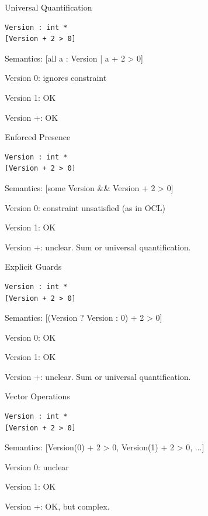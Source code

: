 \documentclass[table,15pt,t]{beamer}
\begin{document}
\begin{frame}[fragile,c]{Universal Quantification}
\begin{lstlisting}
Version : int *
[Version + 2 > 0]
\end{lstlisting}
\begin{list}{}{}
    \item Semantics: [all a : Version | a + 2 > 0]\pause
    \item Version 0: ignores constraint
    \item Version 1: OK
    \item Version +: OK
\end{list}
\end{frame}

\begin{frame}[fragile,c]{Enforced Presence}
\begin{lstlisting}
Version : int *
[Version + 2 > 0]
\end{lstlisting}
\begin{list}{}{}
    \item Semantics: [some Version \&\& Version + 2 > 0]\pause
    \item Version 0: constraint unsatisfied (as in OCL)
    \item Version 1: OK
    \item Version +: unclear. Sum or universal quantification.
\end{list}
\end{frame}

\begin{frame}[fragile,c]{Explicit Guards}
\begin{lstlisting}
Version : int *
[Version + 2 > 0]
\end{lstlisting}
\begin{list}{}{}
    \item Semantics: [(Version ? Version : 0) + 2 > 0]\pause
    \item Version 0: OK
    \item Version 1: OK
    \item Version +: unclear. Sum or universal quantification.
\end{list}
\end{frame}

\begin{frame}[fragile,c]{Vector Operations}
\begin{lstlisting}
Version : int *
[Version + 2 > 0]
\end{lstlisting}
\begin{list}{}{}
    \item Semantics: [Version(0) + 2 > 0, Version(1) + 2 > 0, ...]\pause
    \item Version 0: unclear
    \item Version 1: OK
    \item Version +: OK, but complex.
\end{list}
\end{frame}
\end{document}
